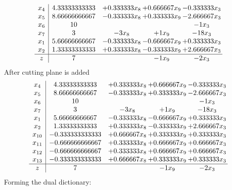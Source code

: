 \documentclass[11pt]{article}
\begin{document}
\[\begin{array}{c| c c@{\hskip 2pt} c@{\hskip 2pt} c@{\hskip 2pt} }
 x_{4}   &  4.33333333333 & + 0.333333 x_{8} & + 0.666667 x_{9} & -0.333333 x_{3}\\
 x_{5}   &  8.66666666667 & -0.333333 x_{8} & + 0.333333 x_{9} & -2.666667 x_{3}\\
 x_{6}   &  10  &    &   & -1 x_{3}\\
 x_{7}   &  3 & -3 x_{8} & + 1 x_{9} & -18 x_{3}\\
 x_{1}   &  5.66666666667 & -0.333333 x_{8} & -0.666667 x_{9} & + 0.333333 x_{3}\\
 x_{2}   &  1.33333333333 & + 0.333333 x_{8} & -0.333333 x_{9} & + 2.666667 x_{3}\\
\hline
z    &  7  &   & -1 x_{9} & -2 x_{3}\\
\end{array}\]
 After cutting plane is added 
\[\begin{array}{c| c c@{\hskip 2pt} c@{\hskip 2pt} c@{\hskip 2pt} }
 x_{4}   &  4.33333333333 & + 0.333333 x_{8} & + 0.666667 x_{9} & -0.333333 x_{3}\\
 x_{5}   &  8.66666666667 & -0.333333 x_{8} & + 0.333333 x_{9} & -2.666667 x_{3}\\
 x_{6}   &  10  &    &   & -1 x_{3}\\
 x_{7}   &  3 & -3 x_{8} & + 1 x_{9} & -18 x_{3}\\
 x_{1}   &  5.66666666667 & -0.333333 x_{8} & -0.666667 x_{9} & + 0.333333 x_{3}\\
 x_{2}   &  1.33333333333 & + 0.333333 x_{8} & -0.333333 x_{9} & + 2.666667 x_{3}\\
 x_{10}   &  -0.333333333333 & + 0.666667 x_{8} & + 0.333333 x_{9} & + 0.333333 x_{3}\\
 x_{11}   &  -0.666666666667 & + 0.333333 x_{8} & + 0.666667 x_{9} & + 0.666667 x_{3}\\
 x_{12}   &  -0.666666666667 & + 0.333333 x_{8} & + 0.666667 x_{9} & + 0.666667 x_{3}\\
 x_{13}   &  -0.333333333333 & + 0.666667 x_{8} & + 0.333333 x_{9} & + 0.333333 x_{3}\\
\hline
z    &  7  &   & -1 x_{9} & -2 x_{3}\\
\end{array}\]
Forming the dual dictionary:
\end{document}
